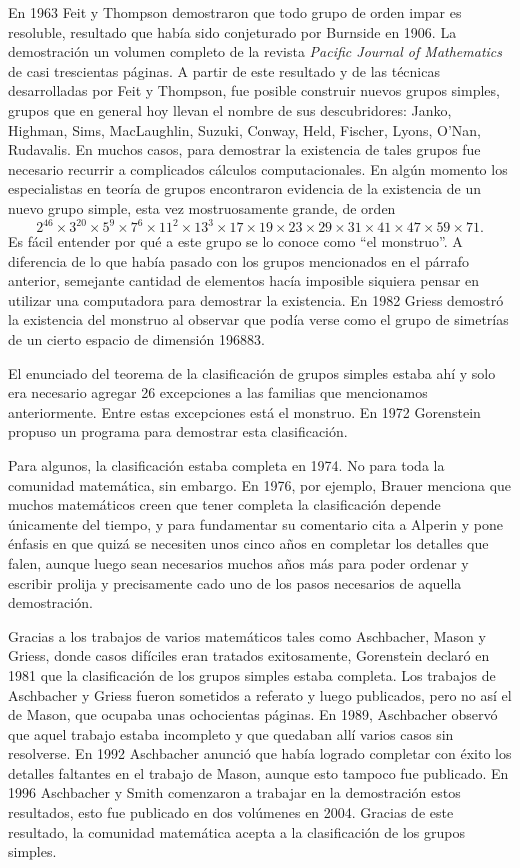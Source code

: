 En 1963 Feit y Thompson demostraron que todo grupo de orden impar es resoluble,
resultado que había sido conjeturado por Burnside en 1906. La demostración un
volumen completo de la revista \emph{Pacific Journal of Mathematics} de casi
trescientas páginas. A partir de este resultado y de las técnicas desarrolladas
por Feit y Thompson, fue posible construir nuevos grupos simples, grupos que en
general hoy llevan el nombre de sus descubridores: Janko, Highman, Sims,
MacLaughlin, Suzuki, Conway, Held, Fischer, Lyons, O'Nan, Rudavalis. En muchos
casos, para demostrar la existencia de tales grupos fue necesario recurrir a
complicados cálculos computacionales. En algún momento los especialistas en
teoría de grupos encontraron evidencia de la existencia de un nuevo grupo
simple, esta vez mostruosamente grande, de orden 
\[
	2^{46}\times 3^{20}\times 5^9\times 7^6\times 11^2\times 13^3\times 17\times 19\times 23\times 29\times 31\times 41\times 47\times 59\times 71. 
\]
Es fácil entender por qué a este grupo se lo conoce como ``el monstruo''.  A
diferencia de lo que había pasado con los grupos mencionados en el párrafo
anterior, semejante cantidad de elementos hacía imposible siquiera pensar en
utilizar una computadora para demostrar la existencia. En 1982 Griess demostró
la existencia del monstruo al observar que podía verse como el grupo de
simetrías de un cierto espacio de dimensión 196883. 

El enunciado del teorema de la clasificación de grupos simples estaba ahí y
solo era necesario agregar 26 excepciones a las familias que mencionamos
anteriormente. Entre estas excepciones está el monstruo.  En 1972 Gorenstein
propuso un programa para demostrar esta clasificación. 

Para algunos, la clasificación estaba completa en 1974. No para toda la
comunidad matemática, sin embargo. En 1976, por ejemplo, Brauer menciona que
muchos matemáticos creen que tener completa la clasificación depende únicamente
del tiempo, y para fundamentar su comentario cita a Alperin y pone énfasis en
que quizá se necesiten unos cinco años en completar los detalles que falen,
aunque luego sean necesarios muchos años más para poder ordenar y escribir
prolija y precisamente cado uno de los pasos necesarios de aquella demostración. 

Gracias a los trabajos de varios matemáticos tales como Aschbacher, Mason y
Griess, donde casos difíciles eran tratados exitosamente, Gorenstein declaró en
1981 que la clasificación de los grupos simples estaba completa. Los trabajos
de Aschbacher y Griess fueron sometidos a referato y luego publicados, pero no
así el de Mason, que ocupaba unas ochocientas páginas.  En 1989, Aschbacher
observó que aquel trabajo estaba incompleto y que quedaban allí varios casos
sin resolverse. En 1992 Aschbacher anunció que había logrado completar con
éxito los detalles faltantes en el trabajo de Mason, aunque esto tampoco fue
publicado. En 1996 Aschbacher y Smith comenzaron a trabajar en la demostración 
estos resultados, esto fue publicado en dos volúmenes en 2004. Gracias
de este resultado, la comunidad matemática acepta a la clasificación de los
grupos simples. 

